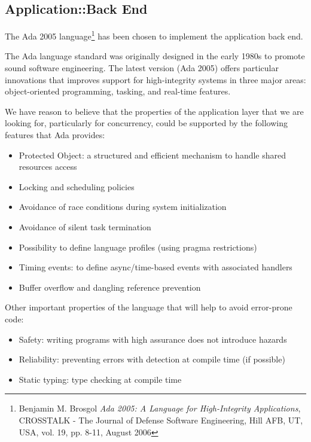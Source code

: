 \subsection{Application::Back End}
The Ada 2005 language\footnote{Benjamin M. Brosgol \textit{Ada 2005: A 
Language for High-Integrity Applications}, CROSSTALK - The Journal of Defense 
Software Engineering, Hill AFB, UT, USA, vol. 19, pp. 8-11, August 2006} 
has been chosen to implement the application back end.

The Ada language standard was originally designed in the early 1980s to promote
sound software engineering. The latest version (Ada 2005) offers particular 
innovations that improves support for high-integrity systems in three major 
areas: object-oriented programming, tasking, and real-time features.

We have reason to believe that the properties of the application layer 
that we are looking for, particularly for concurrency, could be supported 
by the following features that Ada provides:
\begin{itemize}
    \item Protected Object: a structured and efficient mechanism to handle 
shared resources access
    \item Locking and scheduling policies
    \item Avoidance of race conditions during system initialization
    \item Avoidance of silent task termination
    \item Possibility to define language profiles (using pragma restrictions)
    \item Timing events: to define async/time-based events with associated 
handlers
    \item Buffer overflow and dangling reference prevention
\end{itemize}

Other important properties of the language that will help to avoid error-prone 
code:
\begin{itemize}
    \item Safety: writing programs with high assurance does not introduce 
hazards 
    \item Reliability: preventing errors with detection at compile time 
(if possible)
    \item Static typing: type checking at compile time
\end{itemize}
